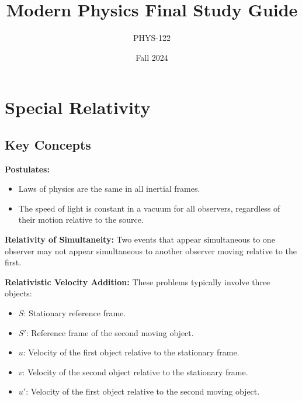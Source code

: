 \documentclass{article}
\title{Modern Physics Final Study Guide}
\author{PHYS-122}
\date{Fall 2024}
\newcommand{\conceptbox}[1]{\begin{tcolorbox}[colback=blue!10] #1 \end{tcolorbox}}
\begin{document}
\maketitle

\newpage

\tableofcontents

\newpage

\section{Special Relativity}

\subsection{Key Concepts}

\conceptbox{
\textbf{Postulates:} 
\begin{itemize}
    \item Laws of physics are the same in all inertial frames.
    \item The speed of light is constant in a vacuum for all observers, regardless of their motion relative to the source.
\end{itemize}
}

\conceptbox{
\textbf{Relativity of Simultaneity:} 
Two events that appear simultaneous to one observer may not appear simultaneous to another observer moving relative to the first.
}

\conceptbox{
\textbf{Relativistic Velocity Addition:} 
These problems typically involve three objects:
\begin{itemize}
    \item $S$: Stationary reference frame.
    \item $S'$: Reference frame of the second moving object.
    \item $u$: Velocity of the first object relative to the stationary frame.
    \item $v$: Velocity of the second object relative to the stationary frame.
    \item $u'$: Velocity of the first object relative to the second moving object.
\end{itemize}
}
\end{document}

